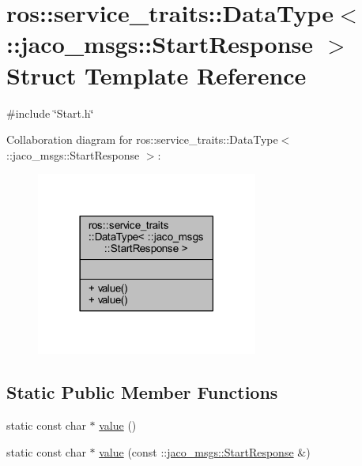 \hypertarget{structros_1_1service__traits_1_1DataType_3_01_1_1jaco__msgs_1_1StartResponse_01_4}{}\section{ros\+:\+:service\+\_\+traits\+:\+:Data\+Type$<$ \+:\+:jaco\+\_\+msgs\+:\+:Start\+Response $>$ Struct Template Reference}
\label{structros_1_1service__traits_1_1DataType_3_01_1_1jaco__msgs_1_1StartResponse_01_4}


{\ttfamily \#include \char`\"{}Start.\+h\char`\"{}}



Collaboration diagram for ros\+:\+:service\+\_\+traits\+:\+:Data\+Type$<$ \+:\+:jaco\+\_\+msgs\+:\+:Start\+Response $>$\+:
\nopagebreak
\begin{figure}[H]
\begin{center}
\leavevmode
\includegraphics[width=206pt]{d1/d44/structros_1_1service__traits_1_1DataType_3_01_1_1jaco__msgs_1_1StartResponse_01_4__coll__graph}
\end{center}
\end{figure}
\subsection*{Static Public Member Functions}
\begin{DoxyCompactItemize}
\item 
static const char $\ast$ \hyperlink{structros_1_1service__traits_1_1DataType_3_01_1_1jaco__msgs_1_1StartResponse_01_4_afccb05c0c07b7ce5ba8da902f6b12133}{value} ()
\item 
static const char $\ast$ \hyperlink{structros_1_1service__traits_1_1DataType_3_01_1_1jaco__msgs_1_1StartResponse_01_4_aa1e7e49ade5a0a15b548c8bdbd49bf2a}{value} (const \+::\hyperlink{namespacejaco__msgs_ab90a2d56175265d26907e49c8a56088d}{jaco\+\_\+msgs\+::\+Start\+Response} \&)
\end{DoxyCompactItemize}


